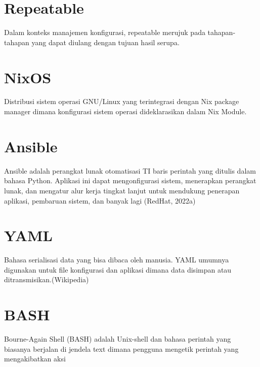 \documentclass[10pt,]{report}
\begin{document}
\section{Repeatable}
\begin{adjustwidth}{20pt}{}
	\vspace{-3mm}
	Dalam konteks manajemen konfigurasi, repeatable merujuk pada tahapan-tahapan
	yang dapat diulang dengan tujuan hasil serupa.
\end{adjustwidth}
\section{NixOS}
\begin{adjustwidth}{20pt}{}
	\vspace{-3mm}
	Distribusi sistem operasi GNU/Linux yang terintegrasi dengan Nix package
	manager dimana konfigurasi sistem operasi dideklarasikan dalam Nix Module.
\end{adjustwidth}
\section{Ansible}
\begin{adjustwidth}{20pt}{}
	\vspace{-3mm}
	Ansible adalah perangkat lunak otomatisasi TI baris perintah yang ditulis dalam
	bahasa Python. Aplikasi ini dapat mengonfigurasi sistem, menerapkan perangkat
	lunak, dan mengatur alur kerja tingkat lanjut untuk mendukung penerapan
	aplikasi, pembaruan sistem, dan banyak lagi (RedHat, 2022a)
\end{adjustwidth}
\section{YAML}
\begin{adjustwidth}{20pt}{}
	\vspace{-3mm}
	Bahasa serialisasi data yang bisa dibaca oleh manusia. YAML umumnya digunakan
	untuk file konfigurasi dan aplikasi dimana data disimpan atau
	ditransmisikan.(Wikipedia)
\end{adjustwidth}
\section{BASH}
\begin{adjustwidth}{20pt}{}
	\vspace{-3mm}
	Bourne-Again Shell (BASH) adalah Unix-shell dan bahasa perintah yang biasanya
	berjalan di jendela text dimana pengguna mengetik perintah yang mengakibatkan
	aksi
\end{adjustwidth}
\end{document}
